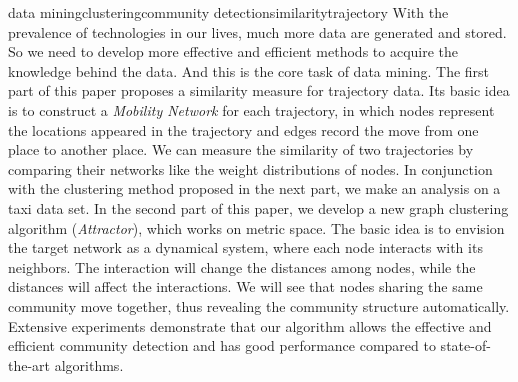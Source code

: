 
\begin{Eabstract}{data mining}{clustering}{community detection}{similarity}{trajectory}
With the prevalence of technologies in our lives, much more data are generated and stored. So we need to develop more effective and efficient methods to acquire the knowledge behind the data. And this is the core task of data mining. The first part of this paper proposes a similarity measure for trajectory data. Its basic idea is to construct a \emph{Mobility Network} for each trajectory, in which nodes represent the locations appeared in the trajectory and edges record the move from one place to another place. We can measure the similarity of two trajectories by comparing their networks like the weight distributions of nodes. In conjunction with the clustering method proposed in the next part, we make an analysis on a taxi data set.  In the second part of this paper, we develop a new graph clustering algorithm (\emph{Attractor}), which works on metric space. The basic idea is to envision the target network as a dynamical system, where each node interacts with its neighbors. The interaction will change the distances among nodes, while the distances will affect the interactions. We will see that nodes sharing the same community move together, thus revealing the community structure automatically.  Extensive experiments demonstrate that our algorithm allows the effective and efficient community detection and has good performance compared to state-of-the-art algorithms. 
\end{Eabstract}



